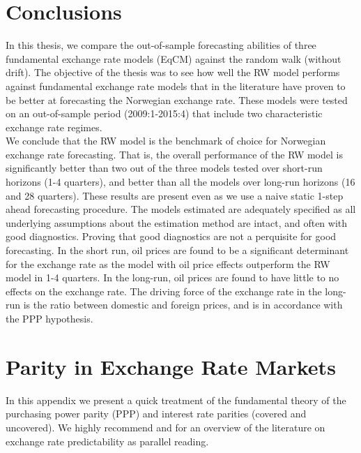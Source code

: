 \documentclass[10pt]{article}
\numberwithin{equation}{section}
\numberwithin{table}{section}
\numberwithin{figure}{section}
\begin{document}
\begin{spacing}{1.5}
\section{Conclusions}

\noindent In this thesis, we compare the out-of-sample forecasting abilities of three fundamental exchange rate models (EqCM) against the random walk (without drift). The objective of the thesis was to see how well the RW model performs against fundamental exchange rate models that in the literature have proven to be better at forecasting the Norwegian exchange rate. These models were tested on an out-of-sample period (2009:1-2015:4) that include two characteristic exchange rate regimes.\\
\indent We conclude that the RW model is the benchmark of choice for Norwegian exchange rate forecasting. That is, the overall performance of the RW model is significantly better than two out of the three models tested over short-run horizons (1-4 quarters), and better than all the models over long-run horizons (16 and 28 quarters). These results are present even as we use a naive static 1-step ahead forecasting procedure. The models estimated are adequately specified as all underlying assumptions about the estimation method are intact, and often with good diagnostics. Proving that good diagnostics are not a perquisite for good forecasting. In the short run, oil prices are found to be a significant determinant for the exchange rate as the model with oil price effects outperform the RW model in 1-4 quarters. In the long-run, oil prices are found to have little to no effects on the exchange rate. The driving force of the exchange rate in the long-run is the ratio between domestic and foreign prices, and is in accordance with the PPP hypothesis.


\newpage

\appendix

\section{Parity in Exchange Rate Markets}
\label{app:1}

\noindent In this appendix we present a quick treatment of the fundamental theory of the purchasing power parity (PPP) and interest rate parities (covered and uncovered). We highly recommend \cite{rogoff2008continuing} and \cite{rossi2013exchange} for an overview of the literature on exchange rate predictability as parallel reading.


\end{spacing}
\end{document}
